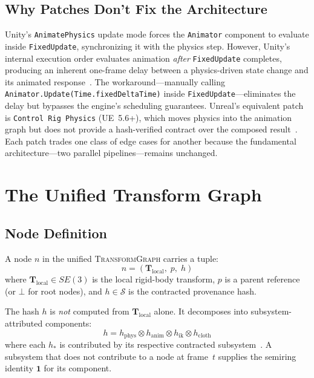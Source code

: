 \documentclass[sigconf,nonacm]{acmart}
\newcommand{\transformgraph}{\textsc{TransformGraph}}
\newcommand{\tropmult}{\otimes}
\newcommand{\provsemiring}{\mathcal{S}} %
\begin{document}
\subsection{Why Patches Don't Fix the Architecture}
Unity's \texttt{AnimatePhysics} update mode forces the
\texttt{Animator} component to evaluate inside
\texttt{FixedUpdate}, synchronizing it with the physics step.
However, Unity's internal execution order evaluates animation
\emph{after} \texttt{FixedUpdate} completes, producing an
inherent one-frame delay between a physics-driven state change
and its animated response~\cite{unity-animatephysics-doc,%
unity-forum-animphys}. The workaround---manually calling
\texttt{Animator.Update(Time.fixedDeltaTime)} inside
\texttt{FixedUpdate}---eliminates the delay but bypasses the
engine's scheduling guarantees. Unreal's equivalent patch is
\texttt{Control Rig Physics} (UE~5.6+), which moves physics
into the animation graph but does not provide a hash-verified
contract over the composed result~\cite{ue5-controlrig-physics}.
Each patch trades one class of edge cases for another because
the fundamental architecture---two parallel pipelines---remains
unchanged.

\section{The Unified Transform Graph}
\label{sec:graph}

\subsection{Node Definition}

A node $n$ in the unified \transformgraph{} carries a tuple:
$$n = (\mathbf{T}_{\text{local}},\; p,\; h)$$
where $\mathbf{T}_{\text{local}} \in SE(3)$ is the local rigid-body
transform, $p$ is a parent reference (or $\bot$ for root nodes),
and $h \in \provsemiring$ is the contracted provenance hash.

The hash $h$ is \emph{not} computed from
$\mathbf{T}_{\text{local}}$ alone. It decomposes into
subsystem-attributed components:
$$h = h_{\text{phys}} \tropmult h_{\text{anim}} \tropmult h_{\text{ik}}
    \tropmult h_{\text{cloth}}$$
where each $h_*$ is contributed by its respective contracted
subsystem~\cite{capstone-uist2027}. A subsystem that does not
contribute to a node at frame~$t$ supplies the semiring identity
$\mathbf{1}$ for its component.
\end{document}
